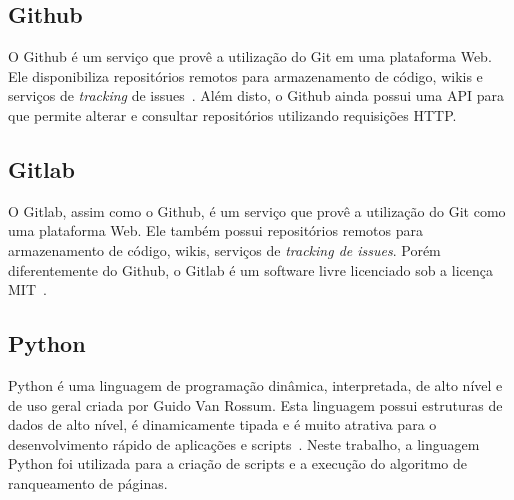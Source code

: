 \subsection{Github}
\label{met:tec:github}
O Github é um serviço que provê a utilização do Git em uma plataforma Web. Ele 
disponibiliza repositórios remotos para armazenamento de código, wikis e serviços
de \textit{tracking} de issues~\cite{github}. Além disto, o Github ainda possui uma API para
que permite alterar e consultar repositórios utilizando requisições HTTP.

\subsection{Gitlab}
\label{met:tec:gitlab}
O Gitlab, assim como o Github, é um serviço que provê a utilização do Git como
uma plataforma Web. Ele também possui repositórios remotos para armazenamento
de código, wikis, serviços de \textit{tracking de issues}. Porém diferentemente
do Github, o Gitlab é um software livre licenciado sob a licença MIT~\cite{gitlab}.

\subsection{Python}
\label{met:tec:python}
Python é uma linguagem de programação dinâmica, interpretada, de alto nível e de 
uso geral criada por Guido Van Rossum. Esta linguagem possui estruturas de dados
de alto nível, é dinamicamente tipada e é muito atrativa para o desenvolvimento rápido
de aplicações e scripts~\cite{python}. Neste trabalho, a linguagem Python foi utilizada para a criação
de scripts e a execução do algoritmo de ranqueamento de páginas.




